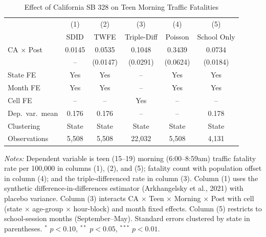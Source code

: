 \begin{table}[htbp]
\centering
\caption{Effect of California SB 328 on Teen Morning Traffic Fatalities}
\label{tab:main}
\begin{threeparttable}
\begin{tabular}{lccccc}
\toprule
 & (1) & (2) & (3) & (4) & (5) \\
 & SDID & TWFE & Triple-Diff & Poisson & School Only \\
\midrule
CA $\times$ Post & 0.0145 & 0.0535\sym{***} & 0.1048\sym{***} & 0.3439\sym{***} & 0.0734\sym{***} \\
 & -- & (0.0147) & (0.0291) & (0.0624) & (0.0184) \\
\midrule
State FE & Yes & Yes & -- & Yes & Yes \\
Month FE & Yes & Yes & -- & Yes & Yes \\
Cell FE & -- & -- & Yes & -- & -- \\
Dep.\ var.\ mean & 0.176 & 0.176 & -- & -- & 0.178 \\
Clustering & State & State & State & State & State \\
Observations & 5,508 & 5,508 & 22,032 & 5,508 & 4,131 \\
\bottomrule
\end{tabular}
\begin{tablenotes}[flushleft]
\small
\item \textit{Notes:} Dependent variable is teen (15--19) morning (6:00--8:59am) traffic fatality rate per 100,000 in columns (1), (2), and (5); fatality count with population offset in column (4); and the triple-differenced rate in column (3). Column (1) uses the synthetic difference-in-differences estimator (Arkhangelsky et al., 2021) with placebo variance. Column (3) interacts CA $\times$ Teen $\times$ Morning $\times$ Post with cell (state $\times$ age-group $\times$ hour-block) and month fixed effects. Column (5) restricts to school-session months (September--May). Standard errors clustered by state in parentheses. $^{*}$ $p<0.10$, $^{**}$ $p<0.05$, $^{***}$ $p<0.01$.
\end{tablenotes}
\end{threeparttable}
\end{table}

